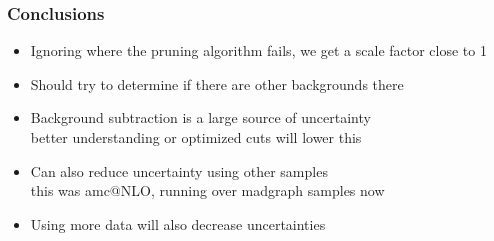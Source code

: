 \documentclass{beamer}
\begin{document}
\begin{frame}
  \frametitle{Conclusions}
  \begin{itemize}
  \item Ignoring where the pruning algorithm fails, we get a scale factor close to 1
  \item Should try to determine if there are other backgrounds there
  \item Background subtraction is a large source of uncertainty \\
    better understanding or optimized cuts will lower this
  \item Can also reduce uncertainty using other samples \\
    this was amc@NLO, running over madgraph samples now
  \item Using more data will also decrease uncertainties
  \end{itemize}
\end{frame}
\end{document}
